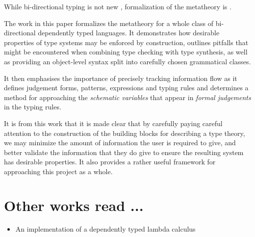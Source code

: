 While bi-directional typing is not new
\cite{DBLP:journals/toplas/PierceT00}, formalization of the metatheory
is \cite{TypesWhoSayNi}. 

The work in this paper formalizes the metatheory for a whole class of
bi-directional dependently typed languages. It demonstrates how
desirable properties of type systems may be enforced by construction,
outlines pitfalls that might be encountered when combining type
checking with type synthesis, as well as providing an object-level
syntax split into carefully chosen grammatical classes.

It then emphasises the importance of precisely tracking information
flow as it defines judgement forms, patterns, expressions and typing
rules and determines a method for approaching the \emph{schematic
  variables} that appear in \emph{formal judgements} in the typing
rules.

It is from this work that it is made clear that by carefully paying
careful attention to the construction of the building blocks for
describing a type theory, we may minimize the amount of information
the user is required to give, and better validate the information that
they do give to ensure the resulting system has desirable
properties. It also provides a rather useful framework for approaching
this project as a whole.

\section{Other works read ...}

\begin{itemize}
\item An implementation of a dependently typed lambda
  calculus \cite{ATutorialImplementationOfDTLC}
\end{itemize}

